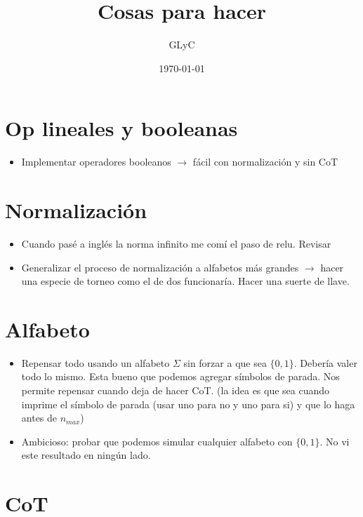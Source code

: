 \documentclass{article}
\title{Cosas para hacer}
\author{GLyC}
\date{\today}
\begin{document}
\maketitle

\section{Op lineales y booleanas}

\begin{itemize}
    \item Implementar operadores booleanos $\rightarrow$ fácil con normalización y sin CoT
\end{itemize}


\section{Normalización}

\begin{itemize}
    \item Cuando pasé a inglés la norma infinito me comí el paso de relu. Revisar
    \item Generalizar el proceso de normalización a alfabetos más grandes $\rightarrow$ hacer una especie de torneo como el de dos funcionaría. Hacer una suerte de llave.
\end{itemize}




\section{Alfabeto}

\begin{itemize}
    \item Repensar todo usando un alfabeto $\Sigma$ sin forzar a que sea $\{0,1\}$. Debería valer todo lo mismo. Esta bueno que podemos agregar símbolos de parada. Nos permite repensar cuando deja de hacer CoT. (la idea es que sea cuando imprime el símbolo de parada (usar uno para no y uno para si) y que lo haga antes de $n_{max}$)
    \item Ambicioso: probar que podemos simular cualquier alfabeto con $\{0,1\}$. No vi este resultado en ningún lado.
\end{itemize}



\section{CoT}
\end{document}
